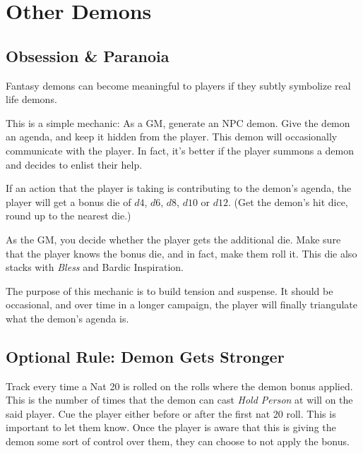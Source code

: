 \documentclass[twocolumn]{dndbook}
\begin{document}
\section{Other Demons}
\subsection{Obsession \& Paranoia}


\begin{emphasisParagraph}
	Fantasy demons can become meaningful to players if they subtly symbolize real life demons.
\end{emphasisParagraph}

This is a simple mechanic: As a GM, generate an NPC demon.
Give the demon an agenda, and keep it hidden from the player.
This demon will occasionally communicate with the player.
In fact, it's better if the player summons a demon and decides to enlist their help.\par

If an action that the player is taking is contributing to the demon's agenda, the player will get a bonus die of $d4$, $d6$, $d8$, $d10$ or $d12$.
(Get the demon's hit dice, round up to the nearest die.)\par
As the GM, you decide whether the player gets the additional die. Make sure that the player knows the bonus die, and in fact, make them roll it.
This die also stacks with \emph{Bless} and Bardic Inspiration.\par

The purpose of this mechanic is to build tension and suspense. It should be occasional, and over time in a longer campaign, the player will finally triangulate what the demon's agenda is.\par

\subsection{Optional Rule: Demon Gets Stronger}
Track every time a Nat 20 is rolled on the rolls where the demon bonus applied.
This is the number of times that the demon can cast \emph{Hold Person} at will on the said player.
Cue the player either before or after the first nat 20 roll.
This is important to let them know.
Once the player is aware that this is giving the demon some sort of control over them, they can choose to not apply the bonus.
\end{document}
